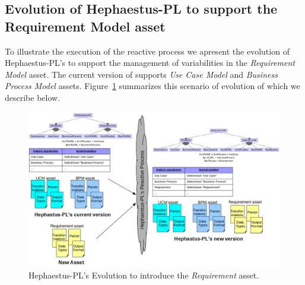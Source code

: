 \subsection{Evolution of Hephaestus-PL to support the Requirement Model asset} \label{sec:evolHplReq}

To illustrate the execution of the reactive process we apresent the evolution of Hephaestus-PL's to support the management of variabilities in the \textit{Requirement Model} asset. The current version of \hpl{} supports \textit{Use Case Model} and \textit{Business Process Model} assets. Figure~\ref{fig:evol-hpl-req} summarizes this scenario of evolution of \hpl{} which we describe below.


\begin{figure}[bth]
\begin{center}
\includegraphics[scale=0.5]{imagens/evol-hpl-req.png}
\end{center}
\caption{Hephaestus-PL's Evolution to introduce the \textit{Requirement} asset.}
\label{fig:evol-hpl-req}
\end{figure}



